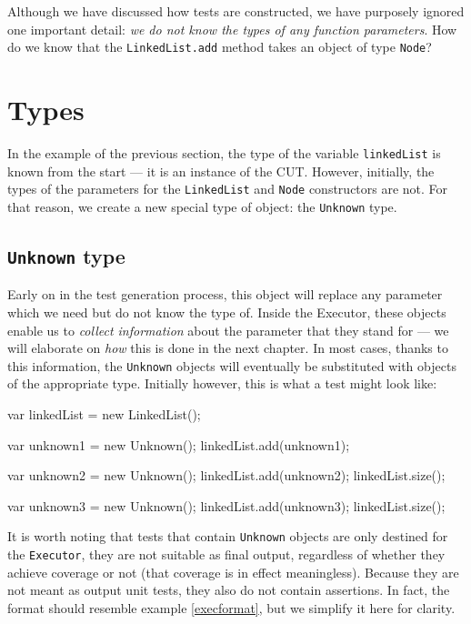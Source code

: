 Although we have discussed how tests are constructed, we have purposely ignored one important detail: \emph{we do not know the types of any function parameters}. How do we know that the \texttt{LinkedList.add} method takes an object of type \texttt{Node}?

\section{Types}

In the example of the previous section, the type of the variable \texttt{linkedList} is known from the start --- it is an instance of the CUT. However, initially, the types of the parameters for the \texttt{LinkedList} and \texttt{Node} constructors are not. For that reason, we create a new special type of object: the \texttt{Unknown} type.

\subsection{\texttt{Unknown} type}

Early on in the test generation process, this object will replace any parameter which we need but do not know the type of. Inside the \textsf{Executor}, these objects enable us to \emph{collect information} about the parameter that they stand for --- we will elaborate on \emph{how} this is done in the next chapter. In most cases, thanks to this information, the \texttt{Unknown} objects will eventually be substituted with objects of the appropriate type. Initially however, this is what a test might look like:

\begin{code}[caption=Unknown parameter types, label=unknowns]
var linkedList = new LinkedList();

var unknown1 = new Unknown();
linkedList.add(unknown1);

var unknown2 = new Unknown();
linkedList.add(unknown2);
linkedList.size();

var unknown3 = new Unknown();
linkedList.add(unknown3);
linkedList.size();
\end{code}

It is worth noting that tests that contain \texttt{Unknown} objects are only destined for the \texttt{Executor}, they are not suitable as final output, regardless of whether they achieve coverage or not (that coverage is in effect meaningless). Because they are not meant as output unit tests, they also do not contain assertions. In fact, the format should resemble example \ref{execformat}, but we simplify it here for clarity.

